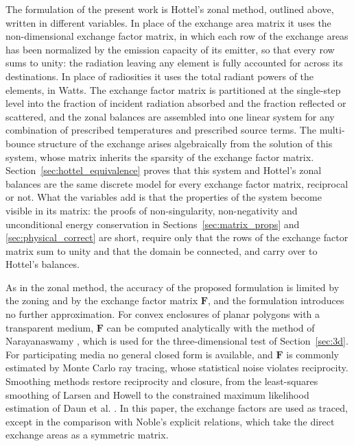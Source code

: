 \documentclass[preprint,1p,times]{elsarticle}
\theoremstyle{plain}
\theoremstyle{definition}
\theoremstyle{remark}
\begin{document}
The formulation of the present work is Hottel's zonal method, outlined above, written in different variables. In place of the exchange area matrix it uses the non-dimensional exchange factor matrix, in which each row of the exchange areas has been normalized by the emission capacity of its emitter, so that every row sums to unity: the radiation leaving any element is fully accounted for across its destinations. In place of radiosities it uses the total radiant powers of the elements, in Watts. The exchange factor matrix is partitioned at the single-step level into the fraction of incident radiation absorbed and the fraction reflected or scattered, and the zonal balances are assembled into one linear system for any combination of prescribed temperatures and prescribed source terms. The multi-bounce structure of the exchange arises algebraically from the solution of this system, whose matrix inherits the sparsity of the exchange factor matrix. Section~\ref{sec:hottel_equivalence} proves that this system and Hottel's zonal balances are the same discrete model for every exchange factor matrix, reciprocal or not. What the variables add is that the properties of the system become visible in its matrix: the proofs of non-singularity, non-negativity and unconditional energy conservation in Sections~\ref{sec:matrix_props} and \ref{sec:physical_correct} are short, require only that the rows of the exchange factor matrix sum to unity and that the domain be connected, and carry over to Hottel's balances.

As in the zonal method, the accuracy of the proposed formulation is limited by the zoning and by the exchange factor matrix $\mathbf{F}$, and the formulation introduces no further approximation. For convex enclosures of planar polygons with a transparent medium, $\mathbf{F}$ can be computed analytically with the method of Narayanaswamy \citep{Narayanaswamy2015}, which is used for the three-dimensional test of Section~\ref{sec:3d}. For participating media no general closed form is available, and $\mathbf{F}$ is commonly estimated by Monte Carlo ray tracing, whose statistical noise violates reciprocity. Smoothing methods restore reciprocity and closure, from the least-squares smoothing of Larsen and Howell \citep{LarsenHowell1986} to the constrained maximum likelihood estimation of Daun et al. \citep{Daun2005}. In this paper, the exchange factors are used as traced, except in the comparison with Noble's explicit relations, which take the direct exchange areas as a symmetric matrix.
\end{document}
